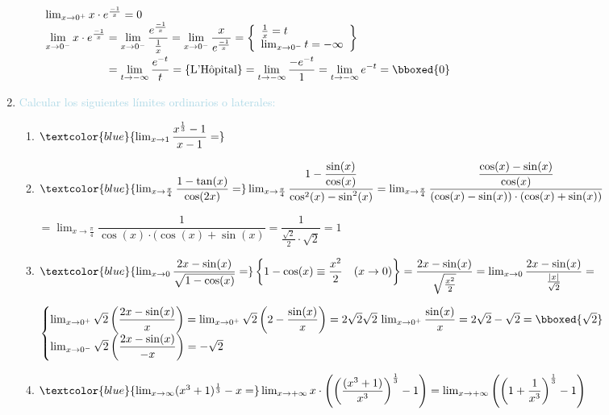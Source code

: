 \begin{enumerate}[label=\color{red}\textbf{\arabic*)}, leftmargin=*]
\begin{enumerate}[label=\color{red}\alph*)]
		$ \begin{array}{l}
			\lim_{x\to0^+}x\cdot e^{\frac{-1}{x}}=0\\
			\begin{aligned}
				\lim_{x\to0^-}x\cdot e^{\frac{-1}{x}}&=\lim_{x\to0^-}\dfrac{e^{\frac{-1}{x}}}{\frac{1}{x}}=\lim_{x\to0^-}\dfrac{x}{e^{\frac{-1}{x}}}=\left\{\begin{array}{l}
				\frac{1}{x}=t\\
				\lim_{x\to0^-}t=-\infty
			\end{array}\right\}\\
			&=\lim_{t\to-\infty}\dfrac{e^{-t}}{t}=\{\text{L'Hôpital}\}=\lim_{t\to-\infty}\dfrac{-e^{-t}}{1}=\lim_{t\to-\infty}e^{-t}=\bboxed{0}
			\end{aligned}
		\end{array}$
	\end{enumerate}
	\item \textcolor{lightblue}{Calcular los siguientes límites ordinarios o laterales:}
	\begin{enumerate}[label=\color{red}\alph*)]
		\item $\textcolor{blue}{\lim_{x\to1}\dfrac{x^{\frac{1}{3}}-1}{x-1}=}$
		\item $\textcolor{blue}{\lim_{x\to\frac{\pi}{4}}\dfrac{1-\tan(x)}{\cos(2x)}=}\lim_{x\to\frac{\pi}{4}}\dfrac{1-\dfrac{\sin(x)}{\cos(x)}}{\cos^2(x)-\sin^2(x)}=\lim_{x\to\frac{\pi}{4}}\dfrac{\dfrac{\cos(x)-\sin(x)}{\cos(x)}}{(\cos(x)-\sin(x))\cdot(\cos(x)+\sin(x))}$
		
		$=\lim_{x\to\frac{\pi}{4}}\dfrac{1}{\cos(x)\cdot(\cos(x)+\sin(x)}=\dfrac{1}{\frac{\sqrt{2}}{2}\cdot\sqrt{2}}=1$
		\item $\textcolor{blue}{\lim_{x\to0}\dfrac{2x-\sin(x)}{\sqrt{1-\cos(x)}}=}\left\{1-\cos(x)\equiv\dfrac{x^2}{2}\quad(x\to0)\right\}=\dfrac{2x-\sin(x)}{\sqrt{\frac{x^2}{2}}}=\lim_{x\to0}\dfrac{2x-\sin(x)}{\frac{|x|}{\sqrt{2}}}=$
		
		$\begin{cases}
		\lim_{x\to0^+}\sqrt{2}\left(\dfrac{2x-\sin(x)}{x}\right)=\lim_{x\to0^+}\sqrt{2}\left(2-\dfrac{\sin(x)}{x}\right)=2\sqrt{2}\sqrt{2}\,\lim_{x\to0^+}\dfrac{\sin(x)}{x}=2\sqrt{2}-\sqrt{2}=\bboxed{\sqrt{2}}\\
		\lim_{x\to0^-}\sqrt{2}\left(\dfrac{2x-\sin(x)}{-x}\right)=-\sqrt{2}
		\end{cases}$
		\item $\textcolor{blue}{\lim_{x\to\infty}(x^3+1)^{\frac{1}{3}}-x=}\lim_{x\to+\infty}x\cdot\left( \left(\dfrac{(x^3+1)}{x^3}\right)^{\frac{1}{3}}-1\right)=\lim_{x\to+\infty}\left(\left(1+\dfrac{1}{x^3}\right)^{\frac{1}{3}}-1\right)$
		

\end{enumerate}
\end{enumerate}
